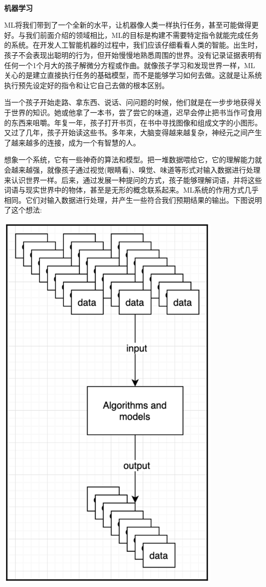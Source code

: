 \noindent\textbf{}\ \par
\textbf{机器学习} \ \par
ML将我们带到了一个全新的水平，让机器像人类一样执行任务，甚至可能做得更好。与我们前面介绍的领域相比，ML的目标是构建不需要特定指令就能完成任务的系统。在开发人工智能机器的过程中，我们应该仔细看看人类的智能。出生时，孩子不会表现出聪明的行为，但开始慢慢地熟悉周围的世界。没有记录证据表明有任何一个1个月大的孩子解微分方程或作曲。就像孩子学习和发现世界一样，ML关心的是建立直接执行任务的基础模型，而不是能够学习如何去做。这就是让系统执行预先设定好的指令和让它自己去做的根本区别。 \par
当一个孩子开始走路、拿东西、说话、问问题的时候，他们就是在一步步地获得关于世界的知识。她或他拿了一本书，尝了尝它的味道，迟早会停止把书当作可食用的东西来咀嚼。年复一年，孩子打开书页，在书中寻找图像和组成文字的小图形。又过了几年，孩子开始读这些书。多年来，大脑变得越来越复杂，神经元之间产生了越来越多的连接，成为一个有智慧的人。 \par
想象一个系统，它有一些神奇的算法和模型。把一堆数据喂给它，它的理解能力就会越来越强，就像孩子通过视觉(眼睛看)、嗅觉、味道等形式对输入数据进行处理来认识世界一样。后来，通过发展一种提问的方式，孩子能够理解词语，并将这些词语与现实世界中的物体，甚至是无形的概念联系起来。ML系统的作用方式几乎相同。它们对输入数据进行处理，并产生一些符合我们预期结果的输出。下图说明了这个想法: \par

\begin{center}
	\includegraphics[width=0.8\textwidth]{content/Section-3/Chapter-15/5}
\end{center}

